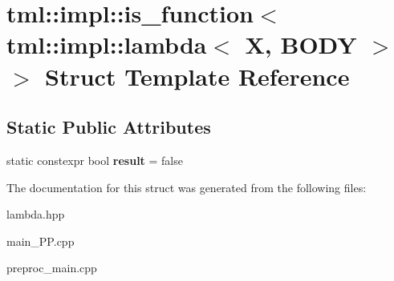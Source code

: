 \hypertarget{structtml_1_1impl_1_1is__function_3_01tml_1_1impl_1_1lambda_3_01X_00_01BODY_01_4_01_4}{\section{tml\+:\+:impl\+:\+:is\+\_\+function$<$ tml\+:\+:impl\+:\+:lambda$<$ X, B\+O\+D\+Y $>$ $>$ Struct Template Reference}
\label{structtml_1_1impl_1_1is__function_3_01tml_1_1impl_1_1lambda_3_01X_00_01BODY_01_4_01_4}
}
\subsection*{Static Public Attributes}
\begin{DoxyCompactItemize}
\item 
\hypertarget{structtml_1_1impl_1_1is__function_3_01tml_1_1impl_1_1lambda_3_01X_00_01BODY_01_4_01_4_a2c7be64de939c0a7424a648f22016d1d}{static constexpr bool {\bfseries result} = false}\label{structtml_1_1impl_1_1is__function_3_01tml_1_1impl_1_1lambda_3_01X_00_01BODY_01_4_01_4_a2c7be64de939c0a7424a648f22016d1d}

\end{DoxyCompactItemize}


The documentation for this struct was generated from the following files\+:\begin{DoxyCompactItemize}
\item 
lambda.\+hpp\item 
main\+\_\+\+P\+P.\+cpp\item 
preproc\+\_\+main.\+cpp\end{DoxyCompactItemize}

